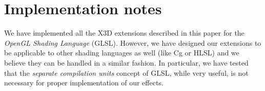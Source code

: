 \documentclass{egpubl}
\begin{document}

\section{Implementation notes}

We have implemented all the X3D extensions described in this paper
for the \emph{OpenGL Shading Language} (GLSL).
However, we have designed our extensions
to be applicable to other shading languages as well (like Cg or HLSL)
and we believe they can be handled in a similar fashion.
In particular, we have tested that the \emph{separate compilation units}
concept of GLSL, while very useful, is not necessary for proper implementation
of our effects.



\end{document}
